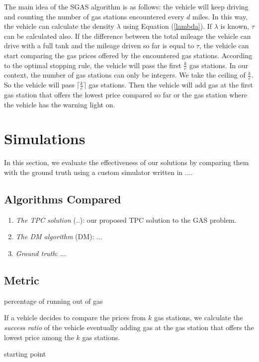 \documentclass[conference]{IEEEtran}
\theoremstyle{definition}
\begin{document}
The main idea of the SGAS algorithm is as follows: the vehicle will keep driving and counting the number of gas stations encountered every $d$ miles. In this way, the vehicle can calculate the density $\lambda$ using Equation (\ref{lambda}). If $\lambda$ is known, $\tau$ can be calculated also. If the difference between the total mileage the vehicle can drive with a full tank and the mileage driven so far is equal to $\tau$, the vehicle can start comparing the gas prices offered by the encountered gas stations. According to the optimal stopping rule, the vehicle will pass the first $\frac{k}{e}$ gas stations. In our context, the number of gas stations can only be integers. We take the ceiling of $\frac{k}{e}$. So the vehicle will pass $\lceil\frac{k}{e}\rceil$ gas stations. Then the vehicle will add gas at the first gas station that offers the lowest price compared so far or the gas station where the vehicle has the warning light on.

\section{Simulations} \label{simulations}
In this section, we evaluate the effectiveness of our solutions by comparing them with the ground truth using a custom simulator written in ....

\subsection{Algorithms Compared}
\begin{enumerate}
\item {\em The TPC solution} (..): our proposed TPC solution to the GAS problem.
\item {\em The DM algorithm} (DM):  ...
\item {\em Ground truth}: ...
\end{enumerate}

\subsection{Metric}
{\color{red} percentage of running out of gas}

If a vehicle decides to compare the prices from $k$ gas stations, we calculate the {\em success ratio} of the vehicle eventually adding gas at the gas station that offers the lowest price among the $k$ gas stations.

{\color{red} starting point}
\end{document}
